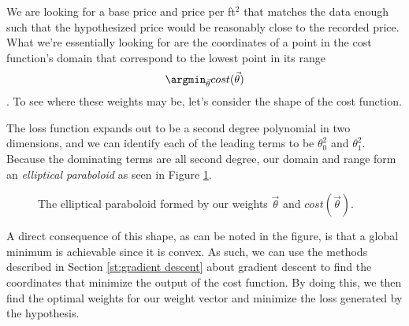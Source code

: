 We are looking for a base price and price per ft$^2$ that matches the data
enough such that the hypothesized price would be reasonably close to the
recorded price. What we're essentially looking for are the coordinates of a
point in the cost function's domain that correspond to the 	lowest point in its range
\begin{equation}
    \argmin_{\vec\theta} cost(\vec\theta)
\end{equation}
. To see where these weights may be, let's consider the shape of the cost function.

The loss function expands out to be a second degree polynomial in two
dimensions, and we can identify each of the leading terms to be $\theta_0^2$ and
$\theta_1^2$. Because the dominating terms are all second degree, our domain and
range form an \emph{elliptical paraboloid} as seen in Figure \ref{fg:cost}. 

\begin{figure}[t!]
    \centering
    \caption{The elliptical paraboloid formed by our weights $\vec\theta$ and $cost(\vec\theta)$.}
    \label{fg:cost}
\end{figure}

A direct consequence of this shape, as can be noted in the figure, is that a
global minimum is achievable since it is convex. As such, we can use
the methods described in Section \ref{st:gradient descent} about gradient
descent to find the coordinates that minimize the output of the cost function.
By doing this, we then find the optimal weights for our weight vector and
minimize the loss generated by the hypothesis.

